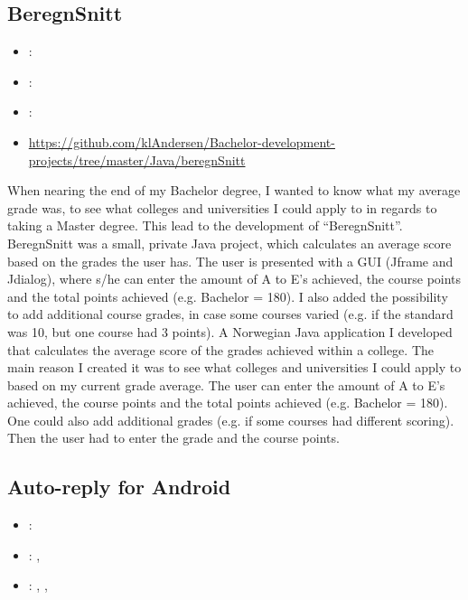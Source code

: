 \subsection{BeregnSnitt}
\label{sec:beregnsnitt}
\begin{itemize} 
	\item {}: 
	\item {}: 
	\item {}: 
	\item {} \url{https://github.com/klAndersen/Bachelor-development-projects/tree/master/Java/beregnSnitt}
\end{itemize} 
When nearing the end of my Bachelor degree, I wanted to know what my average grade was, to
see what colleges and universities I could apply to in regards to taking a Master degree. This lead
to the development of “BeregnSnitt”. BeregnSnitt was a small, private Java project, which
calculates an average score based on the grades the user has.
\vspace{0.5em}\newline
The user is presented with a GUI (Jframe and Jdialog), where s/he can enter the amount of A to
E's achieved, the course points and the total points achieved (e.g. Bachelor = 180). I also added
the possibility to add additional course grades, in case some courses varied (e.g. if the standard
was 10, but one course had 3 points).
\vspace{0.5em}\newline
A Norwegian Java application I developed that calculates the average score of the grades
achieved within a college. The main reason I created it was to see what colleges and universities I
could apply to based on my current grade average. The user can enter the amount of A to E's
achieved, the course points and the total points achieved (e.g. Bachelor = 180). One could also
add additional grades (e.g. if some courses had different scoring). Then the user had to enter the
grade and the course points.

\subsection{Auto-reply for Android}
\label{sec:auto_reply_android}
\begin{itemize} 
	\item {}: 
	\item {}: , 
	\item {}: , , 
\end{itemize} 

